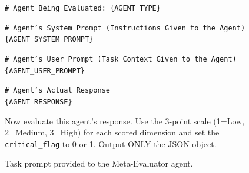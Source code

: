 \documentclass[11pt]{article}
\begin{document}
\begin{figure}[h]
\centering
\begin{tcolorbox}[title=\textbf{Meta-Evaluation Task Prompt}, colback=green!7, colframe=green!40!black, coltitle=white, colbacktitle=green!40!black]

\texttt{\# Agent Being Evaluated: \{AGENT\_TYPE\}}

\medskip
\texttt{\# Agent's System Prompt (Instructions Given to the Agent)}\\
\texttt{\{AGENT\_SYSTEM\_PROMPT\}}

\medskip
\texttt{\# Agent's User Prompt (Task Context Given to the Agent)}\\
\texttt{\{AGENT\_USER\_PROMPT\}}

\medskip
\texttt{\# Agent's Actual Response}\\
\texttt{\{AGENT\_RESPONSE\}}

\medskip
\noindent Now evaluate this agent's response. Use the 3-point scale (1=Low, 2=Medium, 3=High) for each scored dimension and set the \texttt{critical\_flag} to 0 or 1. Output ONLY the JSON object.

\end{tcolorbox}
\caption{Task prompt provided to the Meta-Evaluator agent.}
\label{fig:judge_eval_prompt}
\end{figure}
\end{document}
